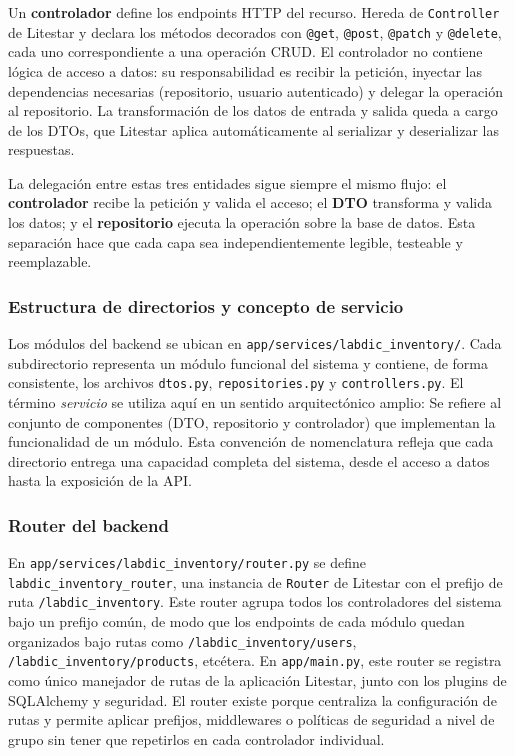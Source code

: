 Un \textbf{controlador} define los endpoints HTTP del recurso. Hereda de 
\texttt{Controller} de Litestar y declara los métodos decorados con 
\texttt{@get}, \texttt{@post}, \texttt{@patch} y \texttt{@delete}, cada uno 
correspondiente a una operación CRUD. El controlador no contiene lógica de acceso a 
datos: su responsabilidad es recibir la petición, inyectar las dependencias necesarias 
(repositorio, usuario autenticado) y delegar la operación al repositorio. La 
transformación de los datos de entrada y salida queda a cargo de los DTOs, que 
Litestar aplica automáticamente al serializar y deserializar las respuestas.

La delegación entre estas tres entidades sigue siempre el mismo flujo: el 
\textbf{controlador} recibe la petición y valida el acceso; el \textbf{DTO} 
transforma y valida los datos; y el \textbf{repositorio} ejecuta la operación sobre 
la base de datos. Esta separación hace que cada capa sea independientemente legible, 
testeable y reemplazable.

\subsubsection*{Estructura de directorios y concepto de servicio}

Los módulos del backend se ubican en \texttt{app/services/labdic\_inventory/}. Cada 
subdirectorio representa un módulo funcional del sistema y contiene, de forma 
consistente, los archivos \texttt{dtos.py}, \texttt{repositories.py} y 
\texttt{controllers.py}. El término \textit{servicio} se utiliza aquí en un sentido 
arquitectónico amplio: Se refiere al conjunto de componentes (DTO, repositorio y 
controlador) que implementan la funcionalidad de un módulo. Esta convención de 
nomenclatura refleja que cada directorio entrega una capacidad completa del sistema, 
desde el acceso a datos hasta la exposición de la API.

\subsubsection*{Router del backend}

En \texttt{app/services/labdic\_inventory/router.py} se define \texttt{labdic\_inventory\_router}, 
una instancia de \texttt{Router} de Litestar con el prefijo de ruta 
\texttt{/labdic\_inventory}. Este router agrupa todos los controladores del sistema 
bajo un prefijo común, de modo que los endpoints de cada módulo quedan organizados 
bajo rutas como \texttt{/labdic\_inventory/users}, \texttt{/labdic\_inventory/products}, 
etcétera. En \texttt{app/main.py}, este router se registra como único manejador de 
rutas de la aplicación Litestar, junto con los plugins de SQLAlchemy y seguridad. 
El router existe porque centraliza la configuración de rutas y permite aplicar 
prefijos, middlewares o políticas de seguridad a nivel de grupo sin tener que 
repetirlos en cada controlador individual.

